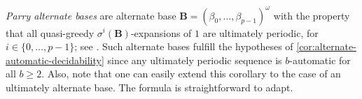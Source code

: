 \documentclass[12pt,reqno]{amsart}
\newcommand{\B}{{\mathbf{B}}}
\begin{document}

\emph{Parry alternate bases} are alternate base $\B=(\beta_0,\ldots,\beta_{p-1})^\omega$ with the property that all quasi-greedy $\sigma^i(\B)$-expansions of $1$ are ultimately periodic, for $i\in\{0,\ldots,p-1\}$; see \cite{CCMP}. Such alternate bases fulfill the hypotheses of \cref{cor:alternate-automatic-decidability} since any ultimately periodic sequence is $b$-automatic for all $b\geq 2$.  
Also, note that one can easily extend this corollary to the case of an ultimately alternate base. The formula is straightforward to adapt.
\end{document}
